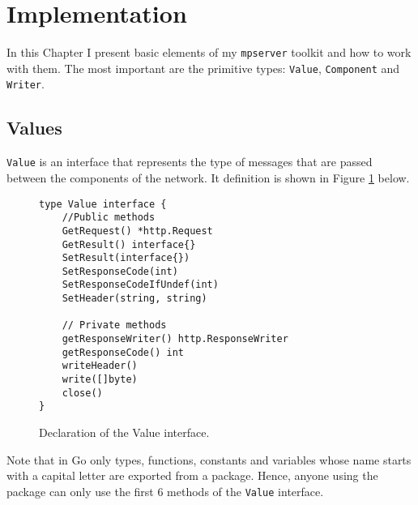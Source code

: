 \documentclass[12pt,a4paper]{article}
\begin{document}

\newpage
\section{Implementation}
\label{sec:impl}
In this Chapter I present basic elements of my \texttt{mpserver} toolkit
and how to work with them. The most important are the primitive types:
\texttt{Value}, \texttt{Component} and \texttt{Writer}.

\subsection{Values}
\texttt{Value} is an interface that represents the type of messages that are
passed between the components of the network. It definition is shown
in Figure \ref{fig:Value} below.

\begin{figure}[h]
\centering
\begin{lstlisting}
type Value interface {
    //Public methods
    GetRequest() *http.Request
    GetResult() interface{}
    SetResult(interface{})
    SetResponseCode(int)
    SetResponseCodeIfUndef(int)
    SetHeader(string, string)

    // Private methods
    getResponseWriter() http.ResponseWriter
    getResponseCode() int
    writeHeader()
    write([]byte)
    close()
}
\end{lstlisting}
\caption[scale=1.0]{Declaration of the Value interface.}
\label{fig:Value}
\end{figure}

Note that in Go only types, functions, constants and variables whose name
starts with a capital letter are exported from a package. Hence, anyone
using the package can only use the first 6 methods of the \texttt{Value}
interface.
\end{document}
